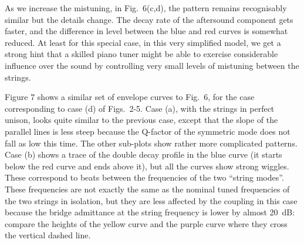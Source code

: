   As we increase the mistuning, in Fig.\ 6(c,d), the pattern remains 
  recognisably similar but the details change. The decay rate of the aftersound 
  component gets faster, and the difference in level between the blue and red 
  curves is somewhat reduced. At least for this special case, in this very 
  simplified model, we get a strong hint that a skilled piano tuner might be 
  able to exercise considerable influence over the sound by controlling very 
  small levels of mistuning between the strings. 

  Figure 7 shows a similar set of envelope curves to Fig.\ 6, for the case 
  corresponding to case (d) of Figs.\ 2-5. Case (a), with the strings in 
  perfect unison, looks quite similar to the previous case, except that the 
  slope of the parallel lines is less steep because the Q-factor of the 
  symmetric mode does not fall as low this time. The other sub-plots show 
  rather more complicated patterns. Case (b) shows a trace of the double decay 
  profile in the blue curve (it starts below the red curve and ends above it), 
  but all the curves show strong wiggles. These correspond to beats between the 
  frequencies of the two ``string modes''. These frequencies are not exactly 
  the same as the nominal tuned frequencies of the two strings in isolation, 
  but they are less affected by the coupling in this case because the bridge 
  admittance at the string frequency is lower by almost 20~dB: compare the 
  heights of the yellow curve and the purple curve where they cross the 
  vertical dashed line. 


